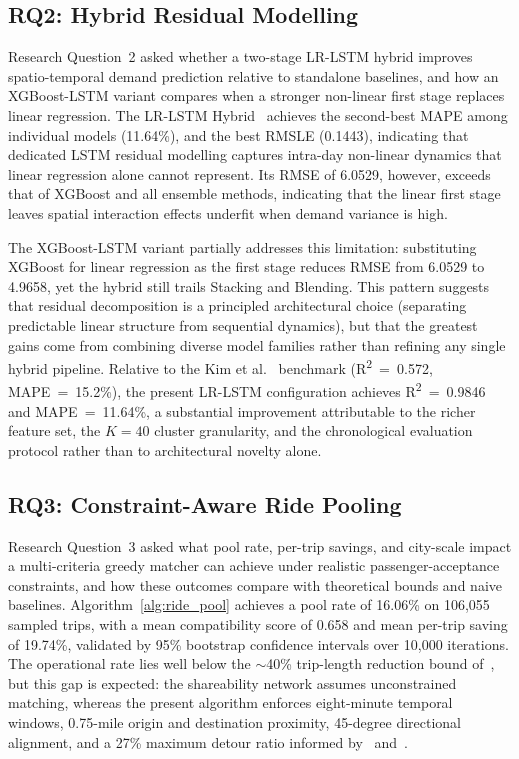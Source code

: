 \subsection{RQ2: Hybrid Residual Modelling}

Research Question~2 asked whether a two-stage LR-LSTM hybrid improves spatio-temporal demand prediction relative to standalone baselines, and how an XGBoost-LSTM variant compares when a stronger non-linear first stage replaces linear regression. The LR-LSTM Hybrid~\parencite{kim2020hybrid} achieves the second-best MAPE among individual models (11.64\%), and the best RMSLE (0.1443), indicating that dedicated LSTM residual modelling captures intra-day non-linear dynamics that linear regression alone cannot represent. Its RMSE of 6.0529, however, exceeds that of XGBoost and all ensemble methods, indicating that the linear first stage leaves spatial interaction effects underfit when demand variance is high.

The XGBoost-LSTM variant partially addresses this limitation: substituting XGBoost for linear regression as the first stage reduces RMSE from 6.0529 to 4.9658, yet the hybrid still trails Stacking and Blending. This pattern suggests that residual decomposition is a principled architectural choice (separating predictable linear structure from sequential dynamics), but that the greatest gains come from combining diverse model families rather than refining any single hybrid pipeline. Relative to the Kim et al.~\parencite{kim2020hybrid} benchmark (R\textsuperscript{2}~=~0.572, MAPE~=~15.2\%), the present LR-LSTM configuration achieves R\textsuperscript{2}~=~0.9846 and MAPE~=~11.64\%, a substantial improvement attributable to the richer feature set, the $K{=}40$ cluster granularity, and the chronological evaluation protocol rather than to architectural novelty alone.

\subsection{RQ3: Constraint-Aware Ride Pooling}

Research Question~3 asked what pool rate, per-trip savings, and city-scale impact a multi-criteria greedy matcher can achieve under realistic passenger-acceptance constraints, and how these outcomes compare with theoretical bounds and naive baselines. Algorithm~\ref{alg:ride_pool} achieves a pool rate of 16.06\% on 106,055 sampled trips, with a mean compatibility score of 0.658 and mean per-trip saving of 19.74\%, validated by 95\% bootstrap confidence intervals over 10,000 iterations. The operational rate lies well below the $\sim$40\% trip-length reduction bound of~\parencite{santi2014quantifying}, but this gap is expected: the shareability network assumes unconstrained matching, whereas the present algorithm enforces eight-minute temporal windows, 0.75-mile origin and destination proximity, 45-degree directional alignment, and a 27\% maximum detour ratio informed by~\parencite{furuhata2013ridesharing} and~\parencite{tang2018joint}.

